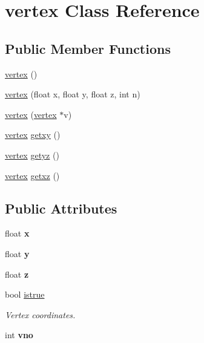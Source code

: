 \hypertarget{classvertex}{}\section{vertex Class Reference}
\label{classvertex}
\subsection*{Public Member Functions}
\begin{DoxyCompactItemize}
\item 
\hyperlink{classvertex_ae32be8790fc66fcc4898cf794f915da0}{vertex} ()
\item 
\hyperlink{classvertex_a21244d3c3938f0fd01420f648a3ff0c9}{vertex} (float x, float y, float z, int n)
\item 
\hyperlink{classvertex_a7fb3e5335e81778130c6fd868831d319}{vertex} (\hyperlink{classvertex}{vertex} $\ast$v)
\item 
\hyperlink{classvertex}{vertex} \hyperlink{classvertex_ae5b40e55917e6241555403f45942ccd9}{getxy} ()
\item 
\hyperlink{classvertex}{vertex} \hyperlink{classvertex_a8e38d6871f63146bba6426b5c2e8cc05}{getyz} ()
\item 
\hyperlink{classvertex}{vertex} \hyperlink{classvertex_a5026b84ec3ebcd83b96d618b89831645}{getxz} ()
\end{DoxyCompactItemize}
\subsection*{Public Attributes}
\begin{DoxyCompactItemize}
\item 
float {\bfseries x}\hypertarget{classvertex_a664a5bbbbca4e1a99d85a163f6a08405}{}\label{classvertex_a664a5bbbbca4e1a99d85a163f6a08405}

\item 
float {\bfseries y}\hypertarget{classvertex_aea3246afd0395032be285a49bcd4b146}{}\label{classvertex_aea3246afd0395032be285a49bcd4b146}

\item 
float {\bfseries z}\hypertarget{classvertex_afe9862f7d3456ee2d352d94cbe5a84da}{}\label{classvertex_afe9862f7d3456ee2d352d94cbe5a84da}

\item 
bool \hyperlink{classvertex_a98fbfcec22ebb5e040c67c75c84d8509}{istrue}\hypertarget{classvertex_a98fbfcec22ebb5e040c67c75c84d8509}{}\label{classvertex_a98fbfcec22ebb5e040c67c75c84d8509}

\begin{DoxyCompactList}\small\item\em Vertex coordinates. \end{DoxyCompactList}\item 
int {\bfseries vno}\hypertarget{classvertex_ab691d7dcbef34df4a48a22568a962c13}{}\label{classvertex_ab691d7dcbef34df4a48a22568a962c13}

\end{DoxyCompactItemize}


